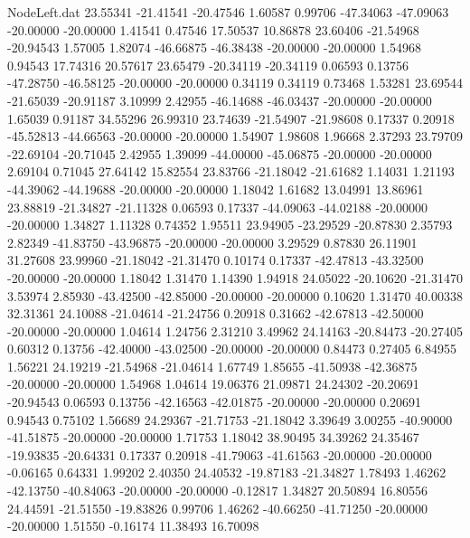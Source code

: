 \begin{filecontents}{NodeLeft.dat}
  23.55341  -21.41541  -20.47546     1.60587    0.99706  -47.34063  -47.09063  -20.00000  -20.00000    1.41541    0.47546   17.50537   10.86878
  23.60406  -21.54968  -20.94543     1.57005    1.82074  -46.66875  -46.38438  -20.00000  -20.00000    1.54968    0.94543   17.74316   20.57617
  23.65479  -20.34119  -20.34119     0.06593    0.13756  -47.28750  -46.58125  -20.00000  -20.00000    0.34119    0.34119    0.73468    1.53281
  23.69544  -21.65039  -20.91187     3.10999    2.42955  -46.14688  -46.03437  -20.00000  -20.00000    1.65039    0.91187   34.55296   26.99310
  23.74639  -21.54907  -21.98608     0.17337    0.20918  -45.52813  -44.66563  -20.00000  -20.00000    1.54907    1.98608    1.96668    2.37293
  23.79709  -22.69104  -20.71045     2.42955    1.39099  -44.00000  -45.06875  -20.00000  -20.00000    2.69104    0.71045   27.64142   15.82554
  23.83766  -21.18042  -21.61682     1.14031    1.21193  -44.39062  -44.19688  -20.00000  -20.00000    1.18042    1.61682   13.04991   13.86961
  23.88819  -21.34827  -21.11328     0.06593    0.17337  -44.09063  -44.02188  -20.00000  -20.00000    1.34827    1.11328    0.74352    1.95511
  23.94905  -23.29529  -20.87830     2.35793    2.82349  -41.83750  -43.96875  -20.00000  -20.00000    3.29529    0.87830   26.11901   31.27608
  23.99960  -21.18042  -21.31470     0.10174    0.17337  -42.47813  -43.32500  -20.00000  -20.00000    1.18042    1.31470    1.14390    1.94918
  24.05022  -20.10620  -21.31470     3.53974    2.85930  -43.42500  -42.85000  -20.00000  -20.00000    0.10620    1.31470   40.00338   32.31361
  24.10088  -21.04614  -21.24756     0.20918    0.31662  -42.67813  -42.50000  -20.00000  -20.00000    1.04614    1.24756    2.31210    3.49962
  24.14163  -20.84473  -20.27405     0.60312    0.13756  -42.40000  -43.02500  -20.00000  -20.00000    0.84473    0.27405    6.84955    1.56221
  24.19219  -21.54968  -21.04614     1.67749    1.85655  -41.50938  -42.36875  -20.00000  -20.00000    1.54968    1.04614   19.06376   21.09871
  24.24302  -20.20691  -20.94543     0.06593    0.13756  -42.16563  -42.01875  -20.00000  -20.00000    0.20691    0.94543    0.75102    1.56689
  24.29367  -21.71753  -21.18042     3.39649    3.00255  -40.90000  -41.51875  -20.00000  -20.00000    1.71753    1.18042   38.90495   34.39262
  24.35467  -19.93835  -20.64331     0.17337    0.20918  -41.79063  -41.61563  -20.00000  -20.00000   -0.06165    0.64331    1.99202    2.40350
  24.40532  -19.87183  -21.34827     1.78493    1.46262  -42.13750  -40.84063  -20.00000  -20.00000   -0.12817    1.34827   20.50894   16.80556
  24.44591  -21.51550  -19.83826     0.99706    1.46262  -40.66250  -41.71250  -20.00000  -20.00000    1.51550   -0.16174   11.38493   16.70098

\end{filecontents}
